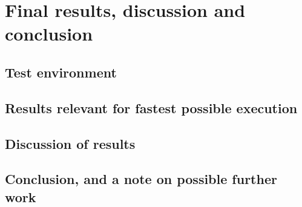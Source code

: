 
\chapter{Final results, discussion and conclusion} %
\label{sec:final_results_discussion_and_conclusion}

\section{Test environment} %
\label{sec:test_environment}


\section{Results relevant for fastest possible execution} %
\label{sub:results_relevant_for_fastest_possible_execution}


\section{Discussion of results} %
\label{sub:discussion_of_results}


\section{Conclusion, and a note on possible further work} %
\label{sub:conclusion_and_a_note_on_possible_further_work}

